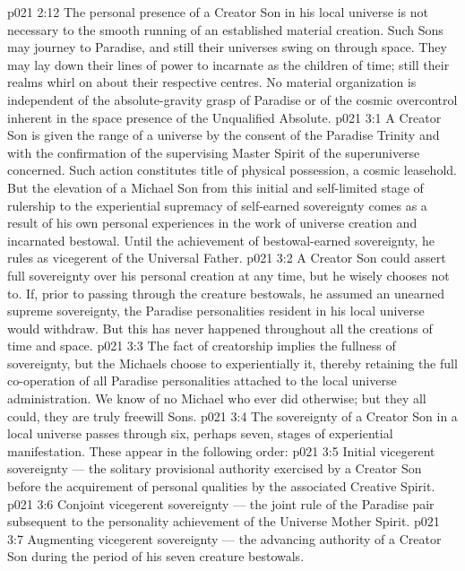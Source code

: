 \vs p021 2:12 The personal presence of a Creator Son in his local universe is not necessary to the smooth running of an established material creation. Such Sons may journey to Paradise, and still their universes swing on through space. They may lay down their lines of power to incarnate as the children of time; still their realms whirl on about their respective centres. No material organization is independent of the absolute\hyp{}gravity grasp of Paradise or of the cosmic overcontrol inherent in the space presence of the Unqualified Absolute.
\vs p021 3:1 A Creator Son is given the range of a universe by the consent of the Paradise Trinity and with the confirmation of the supervising Master Spirit of the superuniverse concerned. Such action constitutes title of physical possession, a cosmic leasehold. But the elevation of a Michael Son from this initial and self\hyp{}limited stage of rulership to the experiential supremacy of self\hyp{}earned sovereignty comes as a result of his own personal experiences in the work of universe creation and incarnated bestowal. Until the achievement of bestowal\hyp{}earned sovereignty, he rules as vicegerent of the Universal Father.
\vs p021 3:2 \pc A Creator Son could assert full sovereignty over his personal creation at any time, but he wisely chooses not to. If, prior to passing through the creature bestowals, he assumed an unearned supreme sovereignty, the Paradise personalities resident in his local universe would withdraw. But this has never happened throughout all the creations of time and space.
\vs p021 3:3 The fact of creatorship implies the fullness of sovereignty, but the Michaels choose to experientially  it, thereby retaining the full co\hyp{}operation of all Paradise personalities attached to the local universe administration. We know of no Michael who ever did otherwise; but they all could, they are truly freewill Sons.
\vs p021 3:4 \pc The sovereignty of a Creator Son in a local universe passes through six, perhaps seven, stages of experiential manifestation. These appear in the following order:
\vs p021 3:5 \bibnobreakspace Initial vicegerent sovereignty --- the solitary provisional authority exercised by a Creator Son before the acquirement of personal qualities by the associated Creative Spirit.
\vs p021 3:6 \bibnobreakspace Conjoint vicegerent sovereignty --- the joint rule of the Paradise pair subsequent to the personality achievement of the Universe Mother Spirit.
\vs p021 3:7 \bibnobreakspace Augmenting vicegerent sovereignty --- the advancing authority of a Creator Son during the period of his seven creature bestowals.
